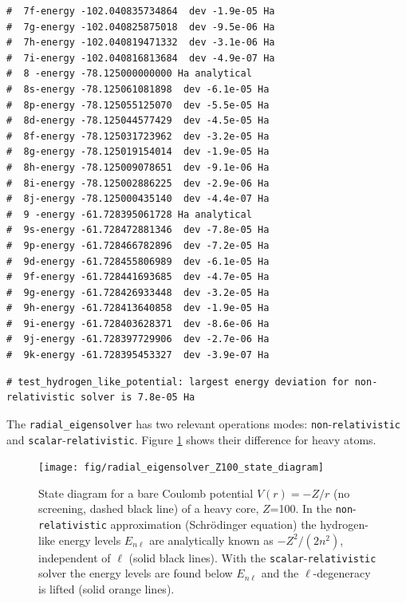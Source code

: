 \documentclass[oribibl]{llncs}
\newcommand{\ttt}[1]{\texttt{#1}}
\begin{document}
\begin{landscape}
\begin{minipage}[t]{.7\textwidth}
\begin{verbatim}
#  7f-energy -102.040835734864  dev -1.9e-05 Ha
#  7g-energy -102.040825875018  dev -9.5e-06 Ha
#  7h-energy -102.040819471332  dev -3.1e-06 Ha
#  7i-energy -102.040816813684  dev -4.9e-07 Ha
#  8 -energy -78.125000000000 Ha analytical
#  8s-energy -78.125061081898  dev -6.1e-05 Ha
#  8p-energy -78.125055125070  dev -5.5e-05 Ha
#  8d-energy -78.125044577429  dev -4.5e-05 Ha
#  8f-energy -78.125031723962  dev -3.2e-05 Ha
#  8g-energy -78.125019154014  dev -1.9e-05 Ha
#  8h-energy -78.125009078651  dev -9.1e-06 Ha
#  8i-energy -78.125002886225  dev -2.9e-06 Ha
#  8j-energy -78.125000435140  dev -4.4e-07 Ha
#  9 -energy -61.728395061728 Ha analytical
#  9s-energy -61.728472881346  dev -7.8e-05 Ha
#  9p-energy -61.728466782896  dev -7.2e-05 Ha
#  9d-energy -61.728455806989  dev -6.1e-05 Ha
#  9f-energy -61.728441693685  dev -4.7e-05 Ha
#  9g-energy -61.728426933448  dev -3.2e-05 Ha
#  9h-energy -61.728413640858  dev -1.9e-05 Ha
#  9i-energy -61.728403628371  dev -8.6e-06 Ha
#  9j-energy -61.728397729906  dev -2.7e-06 Ha
#  9k-energy -61.728395453327  dev -3.9e-07 Ha
\end{verbatim}
%
\end{minipage}
%
\begin{verbatim}
# test_hydrogen_like_potential: largest energy deviation for non-relativistic solver is 7.8e-05 Ha
\end{verbatim}
\normalsize
\end{landscape}

\newpage

The \ttt{radial\_eigensolver} has two relevant operations modes: \ttt{non}-\ttt{relativistic} and \ttt{scalar}-\ttt{relativistic}. Figure \ref{fig:radial-eigensolver-Z100-state-diagram} shows their difference for heavy atoms.
\begin{figure}[t]
	\centering
	\texttt{[image: fig/radial\_eigensolver\_Z100\_state\_diagram]}
	\label{fig:radial-eigensolver-Z100-state-diagram}
	\caption{State diagram for a bare Coulomb potential $V(r) = -Z/r$ (no screening, dashed black line) 
			 of a heavy core, $Z$=100.
			 In the \ttt{non}-\ttt{relativistic} approximation (Schr\"{o}dinger equation)
			 the hydrogen-like energy levels $E_{n\ell}$ are analytically known as $-{Z^2}/({2n^2})$,
			 independent of $\ell$ (solid black lines).
			 With the \ttt{scalar}-\ttt{relativistic} solver the energy levels are found below $E_{n\ell}$
			 and the $\ell$-degeneracy is lifted (solid orange lines).
	         }
\end{figure}
\end{document}
